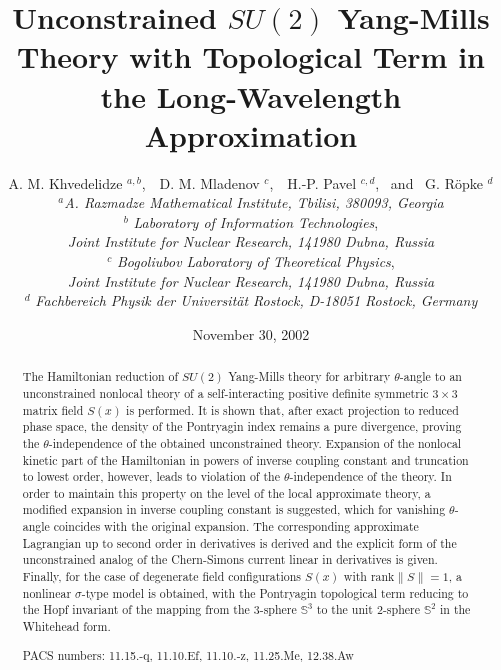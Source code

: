 \documentclass[a4paper,12pt]{article}
\begin{document}
\title{\bf
Unconstrained $SU(2)$ Yang-Mills Theory with Topological Term
in the Long-Wavelength Approximation}

\author{
A. M. Khvedelidze $^{a,b}$,  \,\,
D. M. Mladenov    $^c$,      \,\,
H.-P. Pavel       $^{c,d}$,      \, and  \,
G. R\"opke        $^d$ \\[4mm]
$^a${\it A. Razmadze Mathematical Institute, Tbilisi, 380093, Georgia}\\[2mm]
$^b$ {\it Laboratory of Information Technologies},\\
{\it Joint Institute for Nuclear Research, 141980 Dubna, Russia}\\[2mm]
$^c$ {\it Bogoliubov Laboratory of Theoretical Physics},\\
{\it Joint Institute for Nuclear Research, 141980 Dubna, Russia}\\[2mm]
$^d$ {\it Fachbereich Physik der Universit\"at Rostock, D-18051 Rostock, Germany}}

\date{November 30, 2002}
\maketitle

\begin{abstract}
The Hamiltonian reduction of $SU(2)$ Yang-Mills theory
for arbitrary $\theta$-angle to an unconstrained nonlocal
theory of a self-interacting positive definite symmetric $3\times3$
matrix field $S(x)$ is performed.
It is shown that, after exact projection to reduced phase space,
the density of the Pontryagin index remains a pure divergence,
proving the $\theta$-independence of the obtained unconstrained theory.
Expansion of the nonlocal kinetic part of the Hamiltonian
in powers of inverse coupling constant and truncation to lowest order,
however, leads to violation of the $\theta$-independence of the theory.
In order to maintain this property on the level of the local approximate theory,
a modified expansion in inverse coupling constant is suggested,
which for vanishing $\theta$-angle coincides with the original expansion.
The corresponding approximate Lagrangian up to second order in derivatives
is derived and the explicit form of the unconstrained analog of the Chern-Simons
current linear in derivatives is given.
Finally, for the case of degenerate field configurations
$S(x)$ with $\mbox{rank}\|S\| = 1$, a nonlinear $\sigma$-type model is obtained,
with the Pontryagin topological term reducing to the Hopf invariant of the
mapping from the $3$-sphere $\mathbb{S}^3$ to the unit $2$-sphere $\mathbb{S}^2$
in the Whitehead form.

\vspace{0.5cm}
PACS numbers:  11.15.-q, 11.10.Ef, 11.10.-z, 11.25.Me, 12.38.Aw
\end{abstract}
\end{document}
